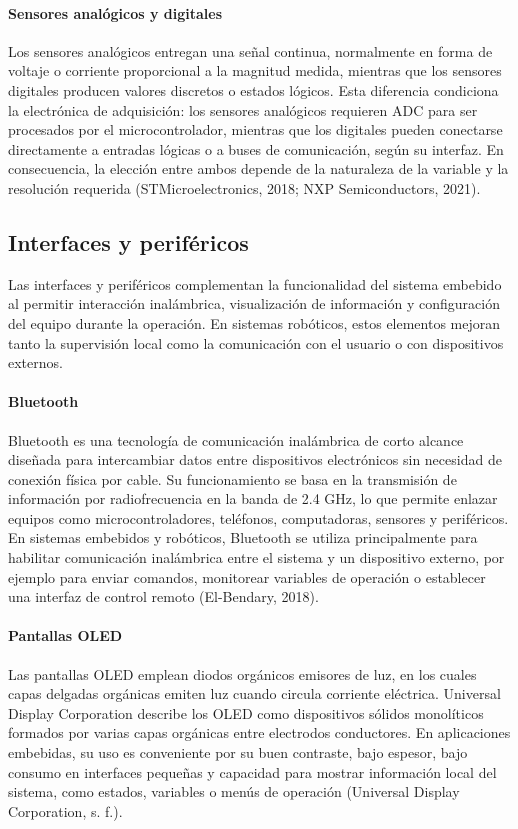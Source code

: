 \paragraph{Sensores analógicos y digitales} Los sensores analógicos entregan una señal continua, normalmente en forma de voltaje o corriente proporcional a la magnitud medida, mientras que los sensores digitales producen valores discretos o estados lógicos. Esta diferencia condiciona la electrónica de adquisición: los sensores analógicos requieren ADC para ser procesados por el microcontrolador, mientras que los digitales pueden conectarse directamente a entradas lógicas o a buses de comunicación, según su interfaz. En consecuencia, la elección entre ambos depende de la naturaleza de la variable y la resolución requerida (STMicroelectronics, 2018; NXP Semiconductors, 2021).

\subsection{Interfaces y periféricos}
Las interfaces y periféricos complementan la funcionalidad del sistema embebido al permitir interacción inalámbrica, visualización de información y configuración del equipo durante la operación. En sistemas robóticos, estos elementos mejoran tanto la supervisión local como la comunicación con el usuario o con dispositivos externos.

\paragraph{Bluetooth} Bluetooth es una tecnología de comunicación inalámbrica de corto alcance diseñada para intercambiar datos entre dispositivos electrónicos sin necesidad de conexión física por cable. Su funcionamiento se basa en la transmisión de información por radiofrecuencia en la banda de 2.4 GHz, lo que permite enlazar equipos como microcontroladores, teléfonos, computadoras, sensores y periféricos. En sistemas embebidos y robóticos, Bluetooth se utiliza principalmente para habilitar comunicación inalámbrica entre el sistema y un dispositivo externo, por ejemplo para enviar comandos, monitorear variables de operación o establecer una interfaz de control remoto (El-Bendary, 2018).

\paragraph{Pantallas OLED}
Las pantallas OLED emplean diodos orgánicos emisores de luz, en los cuales capas delgadas orgánicas emiten luz cuando circula corriente eléctrica. Universal Display Corporation describe los OLED como dispositivos sólidos monolíticos formados por varias capas orgánicas entre electrodos conductores. En aplicaciones embebidas, su uso es conveniente por su buen contraste, bajo espesor, bajo consumo en interfaces pequeñas y capacidad para mostrar información local del sistema, como estados, variables o menús de operación (Universal Display Corporation, s. f.).

